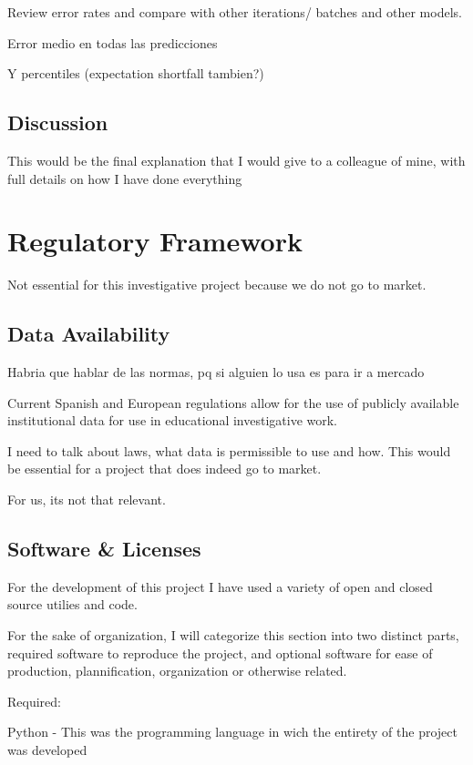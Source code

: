 \documentclass[12pt]{report} %
\begin{document}
Review error rates and compare with other iterations/ batches and other models.

Error medio en todas las predicciones

Y percentiles (expectation shortfall tambien?)


\section{Discussion} %
This would be the final explanation that I would give to a colleague of mine, with full details on how I have done everything



\chapter{Regulatory Framework}
Not essential for this investigative project because we do not go to market.


\section{Data Availability}
Habria que hablar de las normas, pq si alguien lo usa es para ir a mercado

Current Spanish and European regulations allow for the use of publicly available institutional data for use in educational investigative work.

I need to talk about laws, what data is permissible to use and how. This would be essential for a project that does indeed go to market.

For us, its not that relevant.


\section{Software \& Licenses}

For the development of this project I have used a variety of open and closed source utilies and code.

For the sake of organization, I will categorize this section into two distinct parts, required software to reproduce the project, and optional software for ease of production, plannification, organization or otherwise related.

Required:

Python - This was the programming language in wich the entirety of the project was developed \cite{python}
\end{document}
